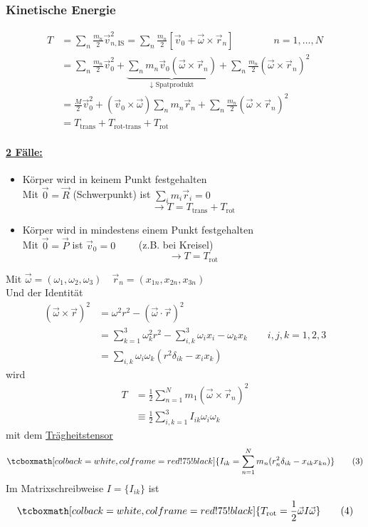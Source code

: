 \documentclass[titlepage,12pt,a4paper,ngerman]{report}
\newcommand{\tx}[1]{\textrm{#1}}
\newcommand{\ub}[1]{\underbrace{#1}}
\newcommand{\rmbox}[1]{\tcboxmath[colback=white,colframe=red!75!black]{#1}} %
\begin{document}
{\subsubsection{Kinetische Energie}
\begin{align*}
T &= \sum_n \frac{m_n}{2} \vec{v}_{n,\tx{IS}}^2 = \sum_n \frac{m_n}{2} [\vec{v}_0 + \vec{\omega}\times \vec{r}_n] \qquad \qquad n = 1,\dots , N \\
&= \sum_n \frac{m_n}{2} \vec{v}_0^2 + \ub{\sum_n m_n \vec{v}_0 (\vec{\omega} \times \vec{r}_n)}_{\downarrow \tx{ Spatprodukt}} + \sum_n \frac{m_n}{2} (\vec{\omega} \times \vec{r}_n)^2 \\
&= \frac{M}{2} \vec{v}_0^2 + (\vec{v}_0 \times \vec{\omega}) \sum_n m_n \vec{r}_n + \sum_n \frac{m_n}{2} (\vec{\omega} \times \vec{r}_n)^2 \\
&= T_{\tx{trans}} + T_{\tx{rot-trans}} + T_{\tx{rot}} \tag{2}
\end{align*}
\paragraph{\underline{2 Fälle:}} 
\begin{itemize}
	\item Körper wird in keinem Punkt festgehalten\\
	Mit $ \vec{0} = \vec{R} $ (Schwerpunkt) ist $ \sum\limits_i m_i \vec{r}_i = 0 $
	$$ \rightarrow T = T_{\tx{trans}} + T_{\tx{rot}}$$
	\item Körper wird in mindestens einem Punkt festgehalten\\
	Mit $ \vec{0} = \vec{P} $ ist $ \vec{v}_0 = 0 \qquad $ (z.B. bei Kreisel) 
	$$ \rightarrow T = T_{\tx{rot}}$$
\end{itemize}
Mit $ \vec{\omega} = ( \omega_1,\omega_2,\omega_3) \quad \vec{r}_n = (x_{1n},x_{2n},x_{3n}) $\\
Und der Identität
\begin{align*}
(\vec{\omega} \times \vec{r})^2 &= \omega^2 r^2 - (\vec{\omega} \cdot \vec{r})^2\\
&= \sum_{k=1}^{3} \omega^2_k r^2 - \sum_{i,k}^{3} \omega_ix_i - \omega_k x_k \qquad i,j,k = 1,2,3\\
&= \sum_{i,k} \omega_i \omega_k (r^2 \delta_{ik} - x_i x_k)
\end{align*}
wird
\begin{align*}
T &= \frac{1}{2} \sum_{n=1}^{N} m_1 (\vec{\omega} \times \vec{r}_n)^2\\
&\equiv \frac{1}{2} \sum_{i,k = 1}^{3} I_{ik} \omega_i \omega_k
\end{align*}
mit dem \underline{Trägheitstensor}
\begin{equation*}
\rmbox{I_{ik} = \sum_{n=1}^{N} m_n (r_n^2 \delta_{ik} - x_{ik} x_{kn}) } \tag{3}
\end{equation*}
Im Matrixschreibweise $ I = \{I_{ik}\} $ ist
\begin{equation*}
\rmbox{T_{\tx{rot}} = \frac{1}{2} \vec{\omega} I \vec{\omega} } \tag{4}
\end{equation*}
}
\end{document}
